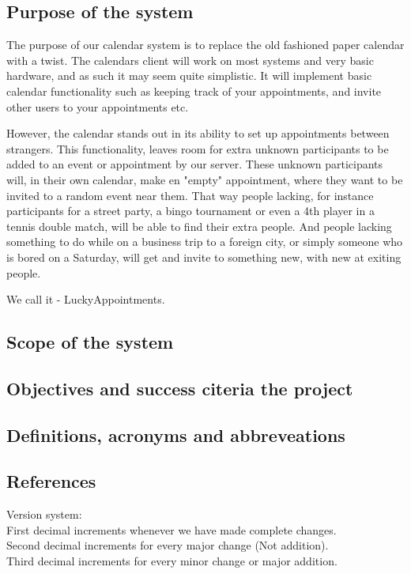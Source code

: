 \subsection{Purpose of the system}
		The purpose of our calendar system is to replace the old fashioned paper calendar with a twist. The calendars client will work on most systems and very basic hardware, and as such it may seem quite simplistic. It will implement basic calendar functionality such as keeping track of your appointments, and invite other users to your appointments etc. 

		However, the calendar stands out in its ability to set up appointments between strangers. This functionality, leaves room for extra unknown participants to be added to an event or appointment by our server. These unknown participants will, in their own calendar, make en "empty" appointment, where they want to be invited to a random event near them. That way people lacking, for instance participants for a street party, a bingo tournament or even a 4th player in a tennis double match, will be able to find their extra people. And people lacking something to do while on a business trip to a foreign city, or simply someone who is bored on a Saturday, will get and invite to something new, with new at exiting people.

		We call it - LuckyAppointments.

\subsection{Scope of the system}

\subsection{Objectives and success citeria the project}

\subsection{Definitions, acronyms and abbreveations}

\subsection{References}


Version system:\\
First decimal increments whenever we have made complete changes. \\
Second decimal increments for every major change (Not addition).   \\
Third decimal increments for every minor change or major addition.\\

